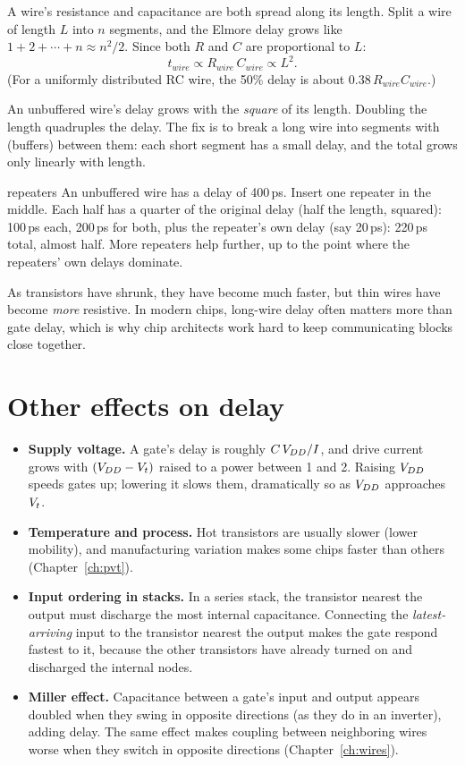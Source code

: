 A wire's resistance and capacitance are both spread along its length. Split a wire of length $L$ into $n$ segments, and the Elmore delay grows like $1 + 2 + \cdots + n \approx n^2/2$. Since both $R$ and $C$ are proportional to $L$:
\[
  t_{wire} \propto R_{wire}\,C_{wire} \propto L^2.
\]
(For a uniformly distributed RC wire, the 50\% delay is about $0.38\,R_{wire}C_{wire}$.)

\begin{bigidea}
An unbuffered wire's delay grows with the \emph{square} of its length. Doubling the length quadruples the delay. The fix is to break a long wire into segments with  (buffers) between them: each short segment has a small delay, and the total grows only linearly with length.
\end{bigidea}

\begin{worked}{repeaters}
An unbuffered wire has a delay of 400\,ps. Insert one repeater in the middle. Each half has a quarter of the original delay (half the length, squared): 100\,ps each, 200\,ps for both, plus the repeater's own delay (say 20\,ps): 220\,ps total, almost half. More repeaters help further, up to the point where the repeaters' own delays dominate.
\end{worked}

As transistors have shrunk, they have become much faster, but thin wires have become \emph{more} resistive. In modern chips, long-wire delay often matters more than gate delay, which is why chip architects work hard to keep communicating blocks close together.

\section{Other effects on delay}

\begin{itemize}
  \item \textbf{Supply voltage.} A gate's delay is roughly $C\,V_{DD}/I$, and drive current grows with $(V_{DD} - V_{t})$ raised to a power between 1 and 2. Raising $V_{DD}$ speeds gates up; lowering it slows them, dramatically so as $V_{DD}$ approaches $V_{t}$.
  \item \textbf{Temperature and process.} Hot transistors are usually slower (lower mobility), and manufacturing variation makes some chips faster than others (Chapter~\ref{ch:pvt}).
  \item \textbf{Input ordering in stacks.} In a series stack, the transistor nearest the output must discharge the most internal capacitance. Connecting the \emph{latest-arriving} input to the transistor nearest the output makes the gate respond fastest to it, because the other transistors have already turned on and discharged the internal nodes.
  \item \textbf{Miller effect.} Capacitance between a gate's input and output appears doubled when they swing in opposite directions (as they do in an inverter), adding delay. The same effect makes coupling between neighboring wires worse when they switch in opposite directions (Chapter~\ref{ch:wires}).
\end{itemize}

